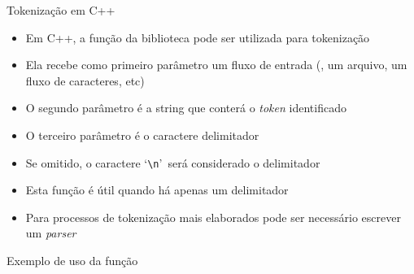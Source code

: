 \begin{frame}[fragile]{Tokenização em C++}

    \begin{itemize}
        \item Em C++, a função  da biblioteca  pode ser 
            utilizada para tokenização

        \item Ela recebe como primeiro parâmetro um fluxo de entrada (, um arquivo, 
            um fluxo de caracteres, etc)

        \item O segundo parâmetro é a string que conterá o \textit{token} identificado 

        \item O terceiro parâmetro é o caractere delimitador

        \item Se omitido, o caractere \lq\verb|\n|\rq\ será considerado o delimitador

        \item Esta função é útil quando há apenas um delimitador

        \item Para processos de tokenização mais elaborados pode ser necessário escrever um \textit{parser}

    \end{itemize}

\end{frame}

\begin{frame}[fragile]{Exemplo de uso da função }
\end{frame}


